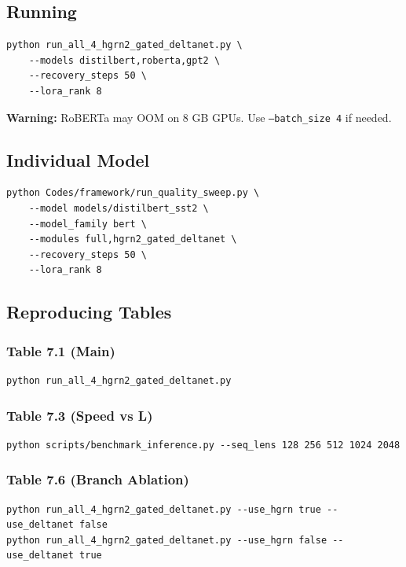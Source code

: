 \subsection{Running}

\begin{lstlisting}
python run_all_4_hgrn2_gated_deltanet.py \
    --models distilbert,roberta,gpt2 \
    --recovery_steps 50 \
    --lora_rank 8
\end{lstlisting}

\textbf{Warning:} RoBERTa may OOM on 8 GB GPUs. Use \texttt{--batch\_size 4} if needed.

\subsection{Individual Model}

\begin{lstlisting}
python Codes/framework/run_quality_sweep.py \
    --model models/distilbert_sst2 \
    --model_family bert \
    --modules full,hgrn2_gated_deltanet \
    --recovery_steps 50 \
    --lora_rank 8
\end{lstlisting}

\subsection{Reproducing Tables}

\subsubsection{Table 7.1 (Main)}
\begin{lstlisting}
python run_all_4_hgrn2_gated_deltanet.py
\end{lstlisting}

\subsubsection{Table 7.3 (Speed vs L)}
\begin{lstlisting}
python scripts/benchmark_inference.py --seq_lens 128 256 512 1024 2048
\end{lstlisting}

\subsubsection{Table 7.6 (Branch Ablation)}
\begin{lstlisting}
python run_all_4_hgrn2_gated_deltanet.py --use_hgrn true --use_deltanet false
python run_all_4_hgrn2_gated_deltanet.py --use_hgrn false --use_deltanet true
\end{lstlisting}

